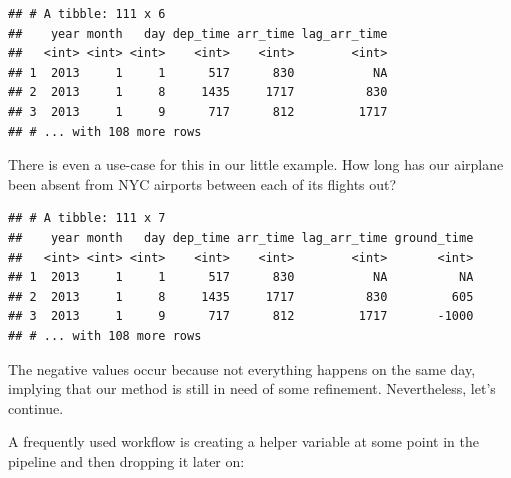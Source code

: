 \documentclass[]{book}
\newenvironment{Shaded}{}{}
\newcommand{\DataTypeTok}[1]{#1}
\newcommand{\KeywordTok}[1]{\textcolor[rgb]{0.00,0.00,1.00}{#1}}
\newcommand{\NormalTok}[1]{#1}
\newcommand{\OperatorTok}[1]{#1}
\newcommand{\StringTok}[1]{\textcolor[rgb]{0.00,0.50,0.50}{#1}}
\begin{document}
\begin{verbatim}
## # A tibble: 111 x 6
##    year month   day dep_time arr_time lag_arr_time
##   <int> <int> <int>    <int>    <int>        <int>
## 1  2013     1     1      517      830           NA
## 2  2013     1     8     1435     1717          830
## 3  2013     1     9      717      812         1717
## # ... with 108 more rows
\end{verbatim}

There is even a use-case for this in our little example.
How long has our airplane been absent from NYC airports between each of its flights out?

\begin{Shaded}
\end{Shaded}

\begin{verbatim}
## # A tibble: 111 x 7
##    year month   day dep_time arr_time lag_arr_time ground_time
##   <int> <int> <int>    <int>    <int>        <int>       <int>
## 1  2013     1     1      517      830           NA          NA
## 2  2013     1     8     1435     1717          830         605
## 3  2013     1     9      717      812         1717       -1000
## # ... with 108 more rows
\end{verbatim}

The negative values occur because not everything happens on the same day, implying that our method is still in need of some refinement.
Nevertheless, let's continue.

A frequently used workflow is creating a helper variable at some point in the pipeline and then dropping it later on:

\begin{Shaded}
\end{Shaded}
\end{document}
